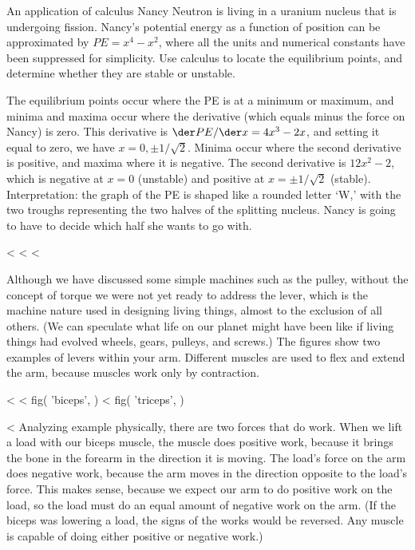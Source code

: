 \begin{eg}{An application of calculus}\label{eg:nancy-neutron}
\egquestion Nancy Neutron is living in a uranium nucleus that
is undergoing fission. Nancy's potential energy as a function of
position can be approximated by $PE=x^4-x^2$, where all the
units and numerical constants have been suppressed for simplicity.
Use calculus to
locate the equilibrium points, and determine whether they are
stable or unstable.

\eganswer The equilibrium points occur where the PE is at a minimum
or maximum, and minima and maxima occur where the derivative (which equals
minus the force on Nancy) is zero.
This derivative is $\der PE/\der x=4x^3-2x$, and setting it equal to
zero, we have $x=0, \pm1/\sqrt{2}$. Minima occur where the second derivative
is positive, and maxima where it is negative. The second derivative is
$12x^2-2$, which is negative at $x=0$ (unstable)
and positive at $x=\pm1/\sqrt{2}$ (stable).
Interpretation: the graph of the PE is shaped like a rounded letter `W,'
with the two troughs representing the two halves of the splitting nucleus.
Nancy is going to have to decide which half she wants to go with.
\end{eg}

<%
<%
<%

Although we have discussed some simple machines such as the
pulley, without the concept of torque we were not yet ready
to address the lever, which is the machine nature used in
designing living things, almost to the exclusion of all
others. (We can speculate what life on our planet might have
been like if living things had evolved wheels, gears,
pulleys, and screws.) The figures show two examples of
levers within your arm. Different muscles are used to flex
and extend the arm, because muscles work only by contraction.

<%
<%
  fig(
    'biceps',
  )
\spacebetweenfigs
<%
  fig(
    'triceps',
  )

<%
Analyzing example  physically, there are two forces that
do work. When we lift a load with our biceps muscle, the
muscle does positive work, because it brings the bone in the
forearm in the direction it is moving. The load's force on
the arm does negative work, because the arm moves in the
direction opposite to the load's force. This makes sense,
because we expect our arm to do positive work on the load,
so the load must do an equal amount of negative work on the
arm. (If the biceps was lowering a load, the signs of the
works would be reversed. Any muscle is capable of doing
either positive or negative work.)

